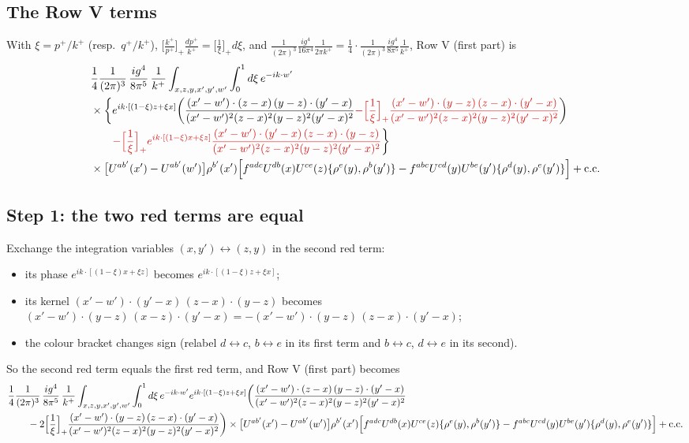 \documentclass[10pt]{article}
\newcommand{\R}[1]{{\color{cR}#1}}
\begin{document}
\subsection*{The Row V terms}
With $\xi=p^{+}/k^{+}$ (resp.\ $q^{+}/k^{+}$), $\big[\frac{k^{+}}{p^{+}}\big]_{+}\frac{dp^{+}}{k^{+}}=\big[\frac1\xi\big]_{+}d\xi$, and $\frac{1}{(2\pi)^{3}}\frac{ig^{4}}{16\pi^{4}}\frac{1}{2\pi k^{+}}=\frac14\cdot\frac{1}{(2\pi)^{3}}\frac{ig^{4}}{8\pi^{5}}\frac{1}{k^{+}}$, Row V (first part) is
\begin{align}
&\frac14\frac{1}{(2\pi)^{3}}\,\frac{ig^{4}}{8\pi^{5}}\,\frac{1}{k^{+}}\int_{x,z,y,x',y',w'}\int_{0}^{1}d\xi\,e^{-ik\cdot w'}\notag\\
&\times\bigg\{e^{ik\cdot[(1-\xi)z+\xi x]}\bigg(\frac{(x'-w')\cdot(z-x)\,(y-z)\cdot(y'-x)}{(x'-w')^{2}(z-x)^{2}(y-z)^{2}(y'-x)^{2}}\R{-\Big[\frac1\xi\Big]_{+}\frac{(x'-w')\cdot(y-z)\,(z-x)\cdot(y'-x)}{(x'-w')^{2}(z-x)^{2}(y-z)^{2}(y'-x)^{2}}}\bigg)\notag\\
&\qquad\R{-\Big[\frac1\xi\Big]_{+}e^{ik\cdot[(1-\xi)x+\xi z]}\frac{(x'-w')\cdot(y'-x)\,(z-x)\cdot(y-z)}{(x'-w')^{2}(z-x)^{2}(y-z)^{2}(y'-x)^{2}}}\bigg\}\notag\\
&\times\big[U^{ab'}(x')-U^{ab'}(w')\big]\rho^{b'}(x')\Big[f^{adc}U^{db}(x)U^{ce}(z)\{\rho^{e}(y),\rho^{b}(y')\}-f^{abc}U^{cd}(y)U^{be}(y')\{\rho^{d}(y),\rho^{e}(y')\}\Big]+{\rm c.c.}
\end{align}

\subsection*{Step 1: the two \R{red} terms are equal}
Exchange the integration variables $(x,y')\leftrightarrow(z,y)$ in the second red term:
\begin{itemize}
\item its phase $e^{ik\cdot[(1-\xi)x+\xi z]}$ becomes $e^{ik\cdot[(1-\xi)z+\xi x]}$;
\item its kernel $(x'-w')\cdot(y'-x)\,(z-x)\cdot(y-z)$ becomes $(x'-w')\cdot(y-z)\,(x-z)\cdot(y'-x)=-(x'-w')\cdot(y-z)\,(z-x)\cdot(y'-x)$;
\item the colour bracket changes sign (relabel $d\leftrightarrow c$, $b\leftrightarrow e$ in its first term and $b\leftrightarrow c$, $d\leftrightarrow e$ in its second).
\end{itemize}
So the second red term equals the first red term, and Row V (first part) becomes
\begin{align}
&\frac14\frac{1}{(2\pi)^{3}}\,\frac{ig^{4}}{8\pi^{5}}\,\frac{1}{k^{+}}\int_{x,z,y,x',y',w'}\int_{0}^{1}d\xi\,e^{-ik\cdot w'}e^{ik\cdot[(1-\xi)z+\xi x]}\bigg(\frac{(x'-w')\cdot(z-x)\,(y-z)\cdot(y'-x)}{(x'-w')^{2}(z-x)^{2}(y-z)^{2}(y'-x)^{2}}\notag\\
&\qquad-2\Big[\frac1\xi\Big]_{+}\frac{(x'-w')\cdot(y-z)\,(z-x)\cdot(y'-x)}{(x'-w')^{2}(z-x)^{2}(y-z)^{2}(y'-x)^{2}}\bigg)\times\big[U^{ab'}(x')-U^{ab'}(w')\big]\rho^{b'}(x')\Big[f^{adc}U^{db}(x)U^{ce}(z)\{\rho^{e}(y),\rho^{b}(y')\}-f^{abc}U^{cd}(y)U^{be}(y')\{\rho^{d}(y),\rho^{e}(y')\}\Big]+{\rm c.c.}
\end{align}
\end{document}

